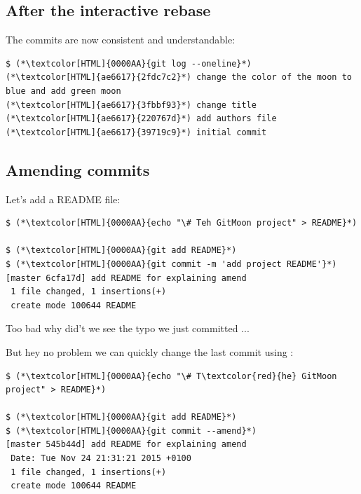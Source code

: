 \subsection{After the interactive rebase}
\begin{frame}[fragile]
  \subslidetitle

  The commits are now consistent and understandable:
  \begin{lstlisting}
$ (*\textcolor[HTML]{0000AA}{git log --oneline}*)
(*\textcolor[HTML]{ae6617}{2fdc7c2}*) change the color of the moon to blue and add green moon
(*\textcolor[HTML]{ae6617}{3fbbf93}*) change title
(*\textcolor[HTML]{ae6617}{220767d}*) add authors file
(*\textcolor[HTML]{ae6617}{39719c9}*) initial commit
\end{lstlisting}

\end{frame}


\subsection{Amending commits}
\begin{frame}[fragile]
  \subslidetitle

  Let's add a README file:

  \begin{lstlisting}
$ (*\textcolor[HTML]{0000AA}{echo "\# Teh GitMoon project" > README}*)

$ (*\textcolor[HTML]{0000AA}{git add README}*)
$ (*\textcolor[HTML]{0000AA}{git commit -m 'add project README'}*)
[master 6cfa17d] add README for explaining amend
 1 file changed, 1 insertions(+)
 create mode 100644 README
\end{lstlisting}

  Too bad why did't we see the typo we just committed ...

  But hey no problem we can quickly change the last commit using :

  \begin{lstlisting}
$ (*\textcolor[HTML]{0000AA}{echo "\# T\textcolor{red}{he} GitMoon project" > README}*)

$ (*\textcolor[HTML]{0000AA}{git add README}*)
$ (*\textcolor[HTML]{0000AA}{git commit --amend}*)
[master 545b44d] add README for explaining amend
 Date: Tue Nov 24 21:31:21 2015 +0100
 1 file changed, 1 insertions(+)
 create mode 100644 README
\end{lstlisting}

\end{frame}

